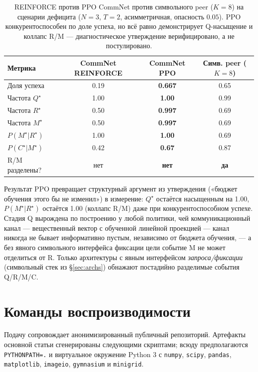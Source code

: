 \documentclass{article}
\begin{document}
\begin{table}[h]
\centering
\small
\caption{REINFORCE против PPO CommNet против символьного peer ($K{=}8$) на сценарии дефицита ($N{=}3$, $T{=}2$, асимметричная, опасность $0.05$). PPO конкурентоспособен по доле успеха, но всё равно демонстрирует Q-насыщение и коллапс R/M --- диагностическое утверждение верифицировано, а не постулировано.}
\label{tab:ppo-commnet}
\begin{tabular}{l c c c}
\toprule
Метрика & CommNet REINFORCE & \textbf{CommNet PPO} & Симв. peer ($K{=}8$) \\
\midrule
Доля успеха                  & 0.19   & \textbf{0.667} & 0.65 \\
Частота $Q^\star$                & 1.00   & \textbf{1.00}  & 0.99 \\
Частота $R^\star$                & 0.50   & \textbf{0.997} & 0.69 \\
Частота $M^\star$                & 0.50   & \textbf{0.997} & 0.69 \\
$P(M^\star|R^\star)$          & 1.00   & \textbf{1.00}  & 0.69 \\
$P(C^\star|M^\star)$          & 0.42   & \textbf{0.67}  & 0.87 \\
R/M разделены?                & нет     & \textbf{нет}    & \textbf{да} \\
\bottomrule
\end{tabular}
\end{table}

Результат PPO превращает структурный аргумент из утверждения («бюджет обучения этого бы не изменил») в измерение: $Q^\star$ остаётся насыщенным на 1.00, $P(M^\star|R^\star)$ остаётся 1.00 (коллапс R/M) даже при конкурентоспособном успехе. Стадия Q вырождена по построению у любой политики, чей коммуникационный канал --- вещественный вектор с обученной линейной проекцией --- канал никогда не бывает информативно пустым, независимо от бюджета обучения, --- а без явного символьного интерфейса фиксации цели событие M не может отделиться от R. Только архитектуры с явным интерфейсом \emph{запроса/фиксации} (символьный стек из \S\ref{sec:archs}) обнажают постадийно разделимые события Q/R/M/C.

\section{Команды воспроизводимости}
\label{app:repro}

Подачу сопровождает анонимизированный публичный репозиторий. Артефакты основной статьи сгенерированы следующими скриптами; всюду предполагаются \texttt{PYTHONPATH=.} и виртуальное окружение Python 3 с \texttt{numpy}, \texttt{scipy}, \texttt{pandas}, \texttt{matplotlib}, \texttt{imageio}, \texttt{gymnasium} и \texttt{minigrid}.
\end{document}
